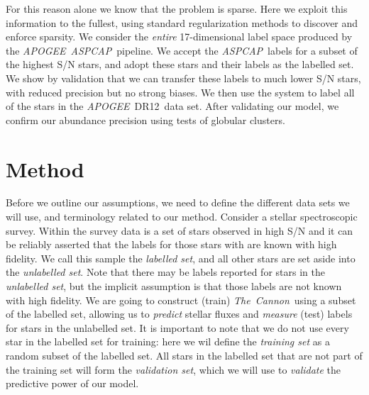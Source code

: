 \documentclass[12pt,preprint]{aastex}
\newcommand{\project}[1]{\textsl{#1}}
\newcommand{\TheCannon}{\project{The~Cannon}}
\newcommand{\acronym}[1]{{\small{#1}}}
\newcommand{\apogee}{\project{\acronym{APOGEE}}}
\newcommand{\aspcap}{\project{\acronym{ASPCAP}}}
\newcommand{\dr}{\acronym{DR12}}
\begin{document}
For this reason alone we know that the problem is sparse.  Here we exploit this 
information to the fullest, using standard regularization methods to discover
and enforce sparsity.  We consider the \emph{entire} 17-dimensional label space 
produced by the \apogee\ \aspcap\ pipeline.  We accept the \aspcap\ labels for 
a subset of the highest S/N stars, and adopt these stars and their labels as the
labelled set.  We show by validation that we can transfer these labels to much 
lower S/N stars, with reduced precision but no strong biases.  We then use the
system to label all of the stars in the \apogee\ \dr\ data set.  After
validating our model, we confirm our abundance precision using tests of globular
clusters.


\section{Method}


Before we outline our assumptions, we need to define the different data sets we
will use, and terminology related to our method. Consider a stellar spectroscopic
survey.  Within the survey data is a set of stars observed in high S/N and it 
can be reliably asserted that the labels for those stars with are known with high
fidelity.  We call this sample the \emph{labelled set}, and all other stars
are set aside into the \emph{unlabelled set}.  Note that there may be labels
reported for stars in the \emph{unlabelled set}, but the implicit assumption is
that those labels are not known with high fidelity.  We are going to construct
(train) \TheCannon\ using a subset of the labelled set, allowing us to 
\emph{predict} stellar fluxes and \emph{measure} (test) labels for stars in the 
unlabelled set.  It is important to note that we do not use every star in the
labelled set for training: here we wil define the \emph{training set} as a random
subset of the labelled set.  All stars in the labelled set that are not part of 
the training set will form the \emph{validation set}, which we will use to 
\emph{validate} the predictive power of our model.
\end{document}

